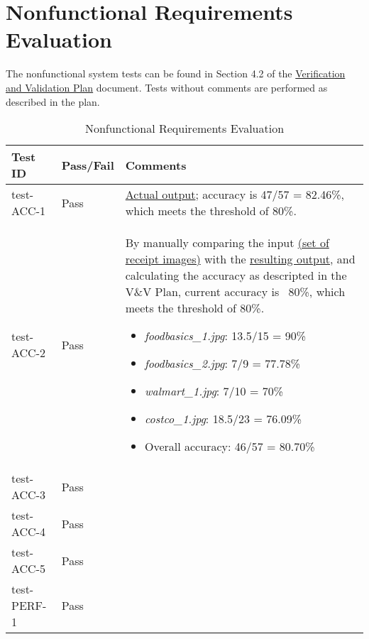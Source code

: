 \documentclass[12pt, titlepage]{article}
\begin{document}
\section{Nonfunctional Requirements Evaluation}

The nonfunctional system tests can be found in Section 4.2 of the
\href{https://github.com/PlutosCapstone/Plutos/blob/main/docs/VnVPlan/VnVPlan.pdf}{Verification
and Validation Plan} document. Tests without comments are performed as described
in the plan.


\begin{longtable}{>{\centering\arraybackslash}p{} >{\centering\arraybackslash}p{} >{\centering\arraybackslash}p{}}
  \caption{Nonfunctional Requirements Evaluation}\\
    \toprule
    \textbf{Test ID} & \textbf{Pass/Fail} & \textbf{Comments} \\
    \midrule
    test-ACC-1 & Pass &
    \href{https://github.com/PlutosCapstone/Plutos/tree/main/src/server/tests/imageProcessing/data/categorization/receipt_items_output.csv}{Actual
    output}; accuracy is 47/57 = 82.46\%, which meets the threshold of 80\%. \\
    test-ACC-2 & Pass & By manually comparing the input
    \href{https://github.com/PlutosCapstone/Plutos/tree/main/src/server/tests/imageProcessing/data/parsing/input}{
    (set of receipt images)} with the
    \href{https://github.com/PlutosCapstone/Plutos/tree/main/src/server/tests/imageProcessing/data/parsing/input}{resulting
    output}, and calculating the accuracy as descripted in the V\&V Plan,
    current accuracy is ~80\%, which meets the threshold of 80\%.
    \begin{itemize}
      \item \textit{foodbasics\_1.jpg}: 13.5/15 = 90\%
      \item \textit{foodbasics\_2.jpg}: 7/9 = 77.78\%
      \item \textit{walmart\_1.jpg}: 7/10 = 70\%
      \item \textit{costco\_1.jpg}: 18.5/23 = 76.09\%
      \item Overall accuracy: 46/57 = 80.70\%
    \end{itemize}\\
    test-ACC-3 & Pass &  \\
    test-ACC-4 & Pass &  \\
    test-ACC-5 & Pass &  \\
    \midrule
    test-PERF-1 & Pass &  \\

\end{longtable}
\end{document}
